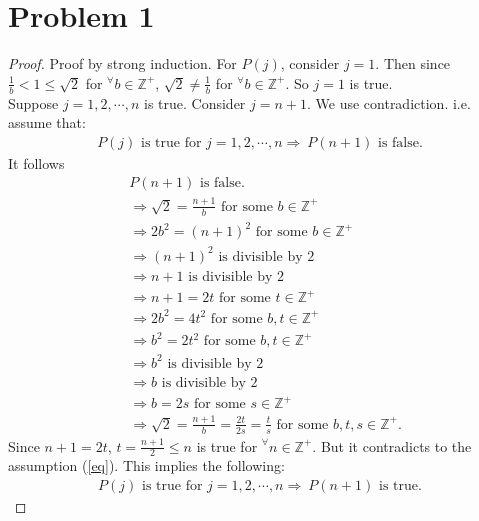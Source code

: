 \section*{Problem 1}
\begin{proof}
	Proof by strong induction. For $P(j)$, consider $j = 1$. Then since $\frac{1}{b} < 1 \leq \sqrt{2}$ for $^\forall b \in \mathbb{Z^+}$, $\sqrt{2} \neq \frac{1}{b}$ for $^\forall b \in \mathbb{Z^+}$. So $j = 1$ is true.\\
	Suppose $j = 1, 2, \cdots, n$ is true. Consider $j = n + 1$. We use contradiction. i.e. assume that:
	\begin{align}
		P(j) \text{ is true  for } j = 1, 2, \cdots, n \Rightarrow\ P(n + 1) \text{ is false.} \label{eq}
	\end{align}
	It follows
	\begin{align*}
		&P(n + 1) \text{ is false.}\\
		&\Rightarrow \sqrt{2} = \frac{n + 1}{b} \text{ for some } b \in \mathbb{Z^+}\\
		&\Rightarrow 2b^2 = (n + 1)^2 \text{ for some } b \in \mathbb{Z^+}\\
		&\Rightarrow (n + 1)^2 \text{ is divisible by } 2\\
		&\Rightarrow n + 1 \text{ is divisible by } 2\\
		&\Rightarrow n + 1 = 2t \text{ for some } t \in \mathbb{Z^+}\\
		&\Rightarrow 2b^2 = 4t^2 \text{ for some } b, t \in \mathbb{Z^+}\\
		&\Rightarrow b^2 = 2t^2 \text{ for some } b, t \in \mathbb{Z^+}\\
		&\Rightarrow b^2 \text{ is divisible by } 2\\
		&\Rightarrow b \text{ is divisible by } 2\\
		&\Rightarrow b = 2s \text{ for some } s \in \mathbb{Z^+}\\
		&\Rightarrow \sqrt{2} = \frac{n + 1}{b} = \frac{2t}{2s} = \frac{t}{s} \text{ for some } b, t, s \in \mathbb{Z^+}.
	\end{align*}
	Since $n + 1 = 2t$, $t = \frac{n + 1}{2} \leq n$ is true for $^\forall n \in \mathbb{Z^+}$. But it contradicts to the assumption (\ref{eq}). This implies the following:
	\begin{align*}
		P(j) \text{ is true  for } j = 1, 2, \cdots, n \Rightarrow\ P(n + 1) \text{ is true.}
	\end{align*}
\end{proof}